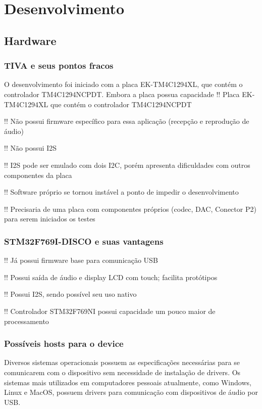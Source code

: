 \chapter{Desenvolvimento}
\section{Hardware}
\subsection{TIVA e seus pontos fracos}
O desenvolvimento foi iniciado com a placa EK-TM4C1294XL, que contém o controlador TM4C1294NCPDT. 
Embora a placa possua capacidade 
!! Placa EK-TM4C1294XL que contém o controlador TM4C1294NCPDT

!! Não possui firmware específico para essa aplicação (recepção e reprodução de áudio)

!! Não possui I2S

!! I2S pode ser emulado com dois I2C, porém apresenta dificuldades com outros componentes da placa

!! Software próprio se tornou instável a ponto de impedir o desenvolvimento

!! Precisaria de uma placa com componentes próprios (codec, DAC, Conector P2) para serem iniciados os testes
\subsection{STM32F769I-DISCO e suas vantagens}

!! Já possui firmware base para comunicação USB

!! Possui saída de áudio e display LCD com touch; facilita protótipos

!! Possui I2S, sendo possível seu uso nativo

!! Controlador STM32F769NI possui capacidade um pouco maior de processamento 


\subsection{Possíveis hosts para o device}

Diversos sistemas operacionais possuem as especificações necessárias para se comunicarem com o dispositivo sem necessidade de instalação de drivers. Os sistemas mais utilizados em computadores pessoais atualmente, como Windows, Linux e MacOS, possuem drivers para comunicação com dispositivos de áudio por USB.

